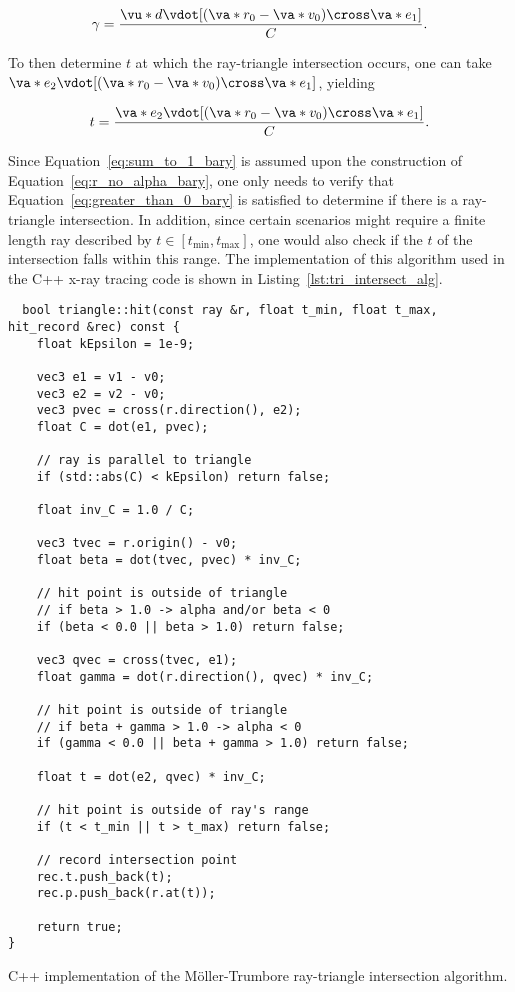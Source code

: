 \begin{equation}
  \gamma = \frac{\vu*{d} \vdot [(\va*{r_0} - \va*{v_0}) \cross \va*{e_1}]}{C}.
  \label{eq:gamma_bary}
\end{equation}

\noindent To then determine $t$ at which the ray-triangle intersection occurs, one can take $\va*{e_2} \vdot [(\va*{r_0} - \va*{v_0}) \cross \va*{e_1}]$, yielding

\begin{equation}
  t = \frac{\va*{e_2} \vdot [(\va*{r_0} - \va*{v_0}) \cross \va*{e_1}]}{C}.
  \label{eq:t_bary}
\end{equation}

\noindent Since Equation~\ref{eq:sum_to_1_bary} is assumed upon the construction of Equation~\ref{eq:r_no_alpha_bary}, one only needs to verify that Equation~\ref{eq:greater_than_0_bary} is satisfied to determine if there is a ray-triangle intersection. In addition, since certain scenarios might require a finite length ray described by $t\in[t_{\textrm{min}}, t_{\textrm{max}}]$, one would also check if the $t$ of the intersection falls within this range. The implementation of this algorithm used in the C++ x-ray tracing code is shown in Listing~\ref{lst:tri_intersect_alg}.

\begin{listing}
\begin{verbatim}
  bool triangle::hit(const ray &r, float t_min, float t_max, hit_record &rec) const {
    float kEpsilon = 1e-9;

    vec3 e1 = v1 - v0;
    vec3 e2 = v2 - v0;
    vec3 pvec = cross(r.direction(), e2);
    float C = dot(e1, pvec);

    // ray is parallel to triangle
    if (std::abs(C) < kEpsilon) return false; 

    float inv_C = 1.0 / C;

    vec3 tvec = r.origin() - v0;
    float beta = dot(tvec, pvec) * inv_C;

    // hit point is outside of triangle
    // if beta > 1.0 -> alpha and/or beta < 0
    if (beta < 0.0 || beta > 1.0) return false;

    vec3 qvec = cross(tvec, e1);
    float gamma = dot(r.direction(), qvec) * inv_C;

    // hit point is outside of triangle
    // if beta + gamma > 1.0 -> alpha < 0
    if (gamma < 0.0 || beta + gamma > 1.0) return false;

    float t = dot(e2, qvec) * inv_C;

    // hit point is outside of ray's range
    if (t < t_min || t > t_max) return false;

    // record intersection point
    rec.t.push_back(t); 
    rec.p.push_back(r.at(t));

    return true;
}
\end{verbatim}
\caption{C++ implementation of the Möller-Trumbore ray-triangle intersection algorithm.}
\label{lst:tri_intersect_alg}
\end{listing}

